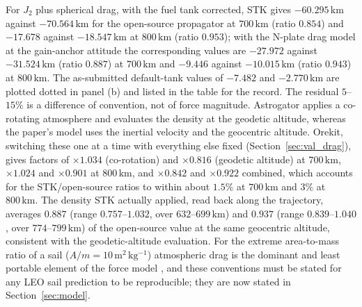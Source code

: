 \vspace{5pt}
\par\noindent For \(J_2\) plus spherical drag, with the fuel tank corrected, STK gives \(-60.295\,\mathrm{km}\) against \(-70.564\,\mathrm{km}\) for the open-source propagator at \(700\,\mathrm{km}\) (ratio \(0.854\)) and \(-17.678\) against \(-18.547\,\mathrm{km}\) at \(800\,\mathrm{km}\) (ratio \(0.953\)); with the N-plate drag model at the gain-anchor attitude the corresponding values are \(-27.972\) against \(-31.524\,\mathrm{km}\) (ratio \(0.887\)) at \(700\,\mathrm{km}\) and \(-9.446\) against \(-10.015\,\mathrm{km}\) (ratio \(0.943\)) at \(800\,\mathrm{km}\). The as-submitted default-tank values of \(-7.482\) and \(-2.770\,\mathrm{km}\) are plotted dotted in panel (b) and listed in the table for the record. The residual \(5\)--\(15\%\) is a difference of convention, not of force magnitude. Astrogator applies a co-rotating atmosphere and evaluates the density at the geodetic altitude, whereas the paper's model uses the inertial velocity and the geocentric altitude. Orekit, switching these one at a time with everything else fixed (Section~\ref{sec:val_drag}), gives factors of \(\times1.034\) (co-rotation) and \(\times0.816\) (geodetic altitude) at \(700\,\mathrm{km}\), \(\times1.024\) and \(\times0.901\) at \(800\,\mathrm{km}\), and \(\times0.842\) and \(\times0.922\) combined, which accounts for the STK/open-source ratios to within about \(1.5\%\) at \(700\,\mathrm{km}\) and \(3\%\) at \(800\,\mathrm{km}\). The density STK actually applied, read back along the trajectory, averages \(0.887\) (range \(0.757\)--\(1.032\), over \(632\)--\(699\,\mathrm{km}\)) and \(0.937\) (range \(0.839\)--\(1.040\), over \(774\)--\(799\,\mathrm{km}\)) of the open-source value at the same geocentric altitude, consistent with the geodetic-altitude evaluation. For the extreme area-to-mass ratio of a sail (\(A/m = 10\,\mathrm{m^2\,kg^{-1}}\)) atmospheric drag is the dominant and least portable element of the force model \citep{anselmoHAMR2010}, and these conventions must be stated for any LEO sail prediction to be reproducible; they are now stated in Section~\ref{sec:model}.

